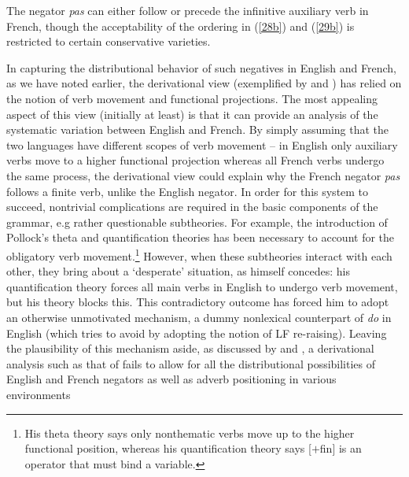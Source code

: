 \documentclass[output=paper]{langsci/langscibook}
\begin{document}
{\begin{exe}
\begin{xlist}
\begin{exe}
\begin{xlist}
\noindent
The negator {\it pas} can either follow or precede the infinitive
auxiliary verb in French, though the acceptability of the
ordering in (\ref{28b}) and (\ref{29b}) is restricted to certain conservative
varieties.



%


In capturing the distributional behavior of such negatives
in English and French, as we have noted earlier,
the derivational view (exemplified by \citet{Pollock:89} and \citet{Chomsky:91})
has relied on the notion of verb
movement and functional projections.  The most appealing aspect of this
view (initially at least) is that it can provide an analysis of the
systematic variation
between English and French. By simply assuming that the
two languages have different scopes of verb movement -- in English
only auxiliary verbs move to a higher functional projection whereas
all French verbs undergo the same process, the derivational
view could explain why the French negator {\it pas} follows
a finite verb, unlike the English negator.  In order for this system to succeed,
nontrivial complications are required in the basic components of the
grammar, e.g rather questionable subtheories.
For example, the introduction of Pollock's theta and quantification
theories has been necessary to account for the obligatory verb
movement.\footnote{His theta theory says only nonthematic verbs move
up to the higher functional position, whereas his quantification
theory says [$+$fin] is an operator that must bind a variable.}
However, when these subtheories interact with each other,
they bring about a `desperate' situation, as \citet[398]{Pollock:89} himself concedes: his quantification theory forces
all main verbs in English to undergo verb movement, but his
theory blocks this. This contradictory outcome has forced him to adopt
an otherwise unmotivated mechanism, a dummy
nonlexical counterpart of {\it do} in English (which \citet{Chomsky:89} tries
to avoid by adopting the notion of LF re-raising).
Leaving the plausibility of this mechanism aside,  as
discussed by \citet{Kim:00} and \citet{KS:02},
a derivational analysis such as that of \citet{Pollock:89}
fails to allow for all the distributional possibilities of
English and French negators as well as adverb positioning in
various environments


\end{xlist}
\end{exe}
\end{xlist}
\end{exe}}
\end{document}
